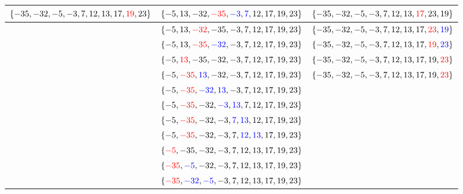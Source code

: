 \begin{longtable}{*{3}{|p{0.31\textwidth}}|}
\hline
\arrayfontsize $\{-35, -32, -5, -3, 7, 12, 13, 17, \textcolor{red}{19}, 23\}$ & \arrayfontsize $\{-5, 13, -32, \textcolor{red}{-35}, \textcolor{blue}{-3}, \textcolor{blue}{7}, 12, 17, 19, 23\}$ & \arrayfontsize $\{-35, -32, -5, -3, 7, 12, 13, \textcolor{red}{17}, 23, 19\}$ \\
\hline
 & \arrayfontsize $\{-5, 13, \textcolor{red}{-32}, -35, -3, 7, 12, 17, 19, 23\}$ & \arrayfontsize $\{-35, -32, -5, -3, 7, 12, 13, 17, \textcolor{red}{23}, \textcolor{blue}{19}\}$ \\
 \hline
 & \arrayfontsize $\{-5, 13, \textcolor{red}{-35}, \textcolor{blue}{-32}, -3, 7, 12, 17, 19, 23\}$ & \arrayfontsize $\{-35, -32, -5, -3, 7, 12, 13, 17, \textcolor{red}{19}, \textcolor{blue}{23}\}$ \\
 \hline
 & \arrayfontsize $\{-5, \textcolor{red}{13}, -35, -32, -3, 7, 12, 17, 19, 23\}$ & \arrayfontsize $\{-35, -32, -5, -3, 7, 12, 13, 17, 19, \textcolor{red}{23}\}$ \\
 \hline
 & \arrayfontsize $\{-5, \textcolor{red}{-35}, \textcolor{blue}{13}, -32, -3, 7, 12, 17, 19, 23\}$ & \arrayfontsize $\{-35, -32, -5, -3, 7, 12, 13, 17, 19, \textcolor{red}{23}\}$ \\
 \hline
 & \arrayfontsize $\{-5, \textcolor{red}{-35}, \textcolor{blue}{-32}, \textcolor{blue}{13}, -3, 7, 12, 17, 19, 23\}$ &   \\
 \hline
 & \arrayfontsize $\{-5, \textcolor{red}{-35}, -32, \textcolor{blue}{-3}, \textcolor{blue}{13}, 7, 12, 17, 19, 23\}$ &   \\
 \hline
 & \arrayfontsize $\{-5, \textcolor{red}{-35}, -32, -3, \textcolor{blue}{7}, \textcolor{blue}{13}, 12, 17, 19, 23\}$ &   \\
 \hline
 & \arrayfontsize $\{-5, \textcolor{red}{-35}, -32, -3, 7, \textcolor{blue}{12}, \textcolor{blue}{13}, 17, 19, 23\}$ &   \\
 \hline
 & \arrayfontsize $\{\textcolor{red}{-5}, -35, -32, -3, 7, 12, 13, 17, 19, 23\}$ &   \\
 \hline
 & \arrayfontsize $\{\textcolor{red}{-35}, \textcolor{blue}{-5}, -32, -3, 7, 12, 13, 17, 19, 23\}$ &   \\
 \hline
 & \arrayfontsize $\{\textcolor{red}{-35}, \textcolor{blue}{-32}, \textcolor{blue}{-5}, -3, 7, 12, 13, 17, 19, 23\}$ &   \\
 \hline
\end{longtable}